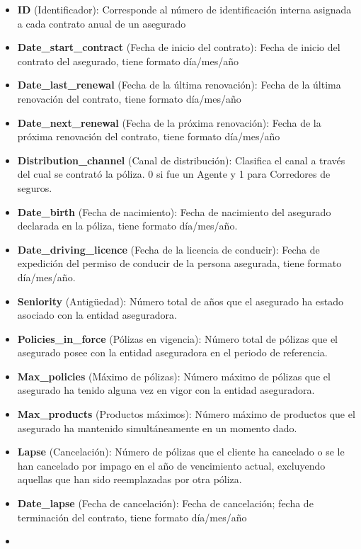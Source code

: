 \documentclass[
  spanish,
  11pt,
  letterpaper,
]{article}
\begin{document}
\begin{itemize}
\item
  \textbf{ID} (Identificador): Corresponde al número de identificación
  interna asignada a cada contrato anual de un asegurado
\item
  \textbf{Date\_start\_contract} (Fecha de inicio del contrato): Fecha
  de inicio del contrato del asegurado, tiene formato día/mes/año
\item
  \textbf{Date\_last\_renewal} (Fecha de la última renovación): Fecha de
  la última renovación del contrato, tiene formato día/mes/año
\item
  \textbf{Date\_next\_renewal} (Fecha de la próxima renovación): Fecha
  de la próxima renovación del contrato, tiene formato día/mes/año
\item
  \textbf{Distribution\_channel} (Canal de distribución): Clasifica el
  canal a través del cual se contrató la póliza. 0 si fue un Agente y 1
  para Corredores de seguros.
\item
  \textbf{Date\_birth} (Fecha de nacimiento): Fecha de nacimiento del
  asegurado declarada en la póliza, tiene formato día/mes/año.
\item
  \textbf{Date\_driving\_licence} (Fecha de la licencia de conducir):
  Fecha de expedición del permiso de conducir de la persona asegurada,
  tiene formato día/mes/año.
\item
  \textbf{Seniority} (Antigüedad): Número total de años que el asegurado
  ha estado asociado con la entidad aseguradora.
\item
  \textbf{Policies\_in\_force} (Pólizas en vigencia): Número total de
  pólizas que el asegurado posee con la entidad aseguradora en el
  periodo de referencia.
\item
  \textbf{Max\_policies} (Máximo de pólizas): Número máximo de pólizas
  que el asegurado ha tenido alguna vez en vigor con la entidad
  aseguradora.
\item
  \textbf{Max\_products} (Productos máximos): Número máximo de productos
  que el asegurado ha mantenido simultáneamente en un momento dado.
\item
  \textbf{Lapse} (Cancelación): Número de pólizas que el cliente ha
  cancelado o se le han cancelado por impago en el año de vencimiento
  actual, excluyendo aquellas que han sido reemplazadas por otra póliza.
\item
  \textbf{Date\_lapse} (Fecha de cancelación): Fecha de cancelación;
  fecha de terminación del contrato, tiene formato día/mes/año
\item

\end{itemize}
\end{document}

